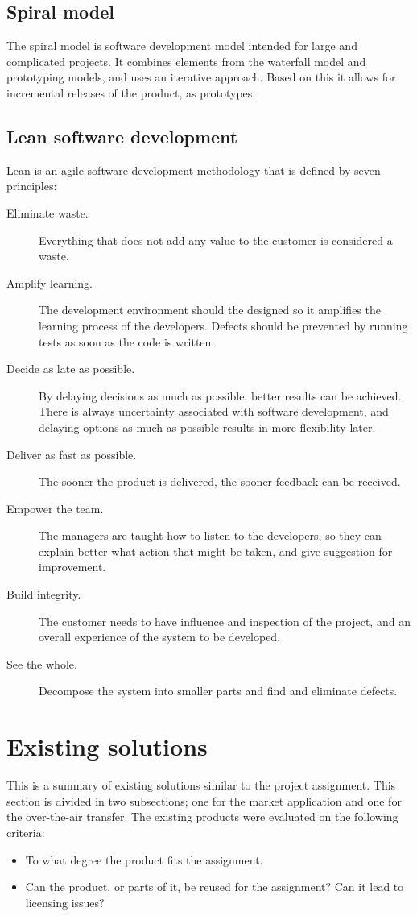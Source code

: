 \subsection{Spiral model}
The spiral model is software development model intended for large and complicated projects. It combines elements from the waterfall model and prototyping models, and uses an iterative approach. Based on this it allows for incremental releases of the product, as prototypes.

\subsection{Lean software development}
Lean is an agile software development methodology that is defined by seven principles:
\begin{description}
	\item[Eliminate waste.]{Everything that does not add any value to the customer is considered a waste.}
	\item[Amplify learning.]{The development environment should the designed so it amplifies the learning process of the developers. Defects should be prevented by running tests as soon as the code is written.}
	\item[Decide as late as possible.]{By delaying decisions as much as possible, better results can be achieved. There is always uncertainty associated with software development, and delaying options as much as possible results in more flexibility later.} 
	\item[Deliver as fast as possible.]{The sooner the product is delivered, the sooner feedback can be received.}
	\item[Empower the team.]{The managers are taught how to listen to the developers, so they can explain better what action that might be taken, and give suggestion for improvement.}
	\item[Build integrity.]{The customer needs to have influence and inspection of the project, and an overall experience of the system to be developed.}
	\item[See the whole.]{Decompose the system into smaller parts and find and eliminate defects.}
\end{description}

\section{Existing solutions}
This is a summary of existing solutions similar to the project assignment. This section is divided in two subsections; one for the market application and one for the over-the-air transfer. The existing products were evaluated on the following criteria:
\begin{itemize}
	\item{To what degree the product fits the assignment.}
	\item{Can the product, or parts of it, be reused for the assignment? Can it lead to licensing issues?}
\end{itemize}

